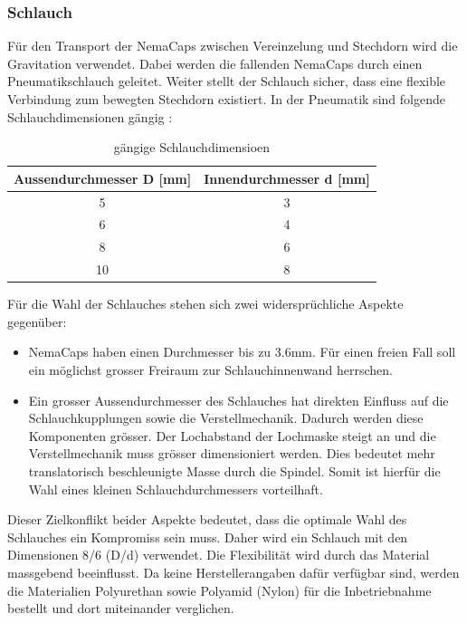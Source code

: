 \subsubsection{Schlauch}
Für den Transport der NemaCaps zwischen Vereinzelung und Stechdorn wird die Gravitation verwendet. Dabei werden die fallenden NemaCaps durch einen Pneumatikschlauch geleitet. Weiter stellt der Schlauch sicher, dass eine flexible Verbindung zum bewegten Stechdorn existiert. In der Pneumatik sind folgende Schlauchdimensionen gängig \cite{camozzi}:
\newline
\begin{table}[H]
\begin{tabular}{|c|c|}
	\hline 
	Aussendurchmesser D [mm] & Innendurchmesser d [mm] \\ 
	\hline 
	5 & 3 \\ 
	\hline 
	6 & 4  \\ 
	\hline 
	8 & 6 \\ 
	\hline 
	10 & 8  \\ 
	\hline 
\end{tabular}
	\caption{gängige Schlauchdimensioen}
	\label{tab:Schlauchdimensioen}
\end{table}

Für die Wahl der Schlauches stehen sich zwei widersprüchliche Aspekte gegenüber:
\begin{itemize}
	\item NemaCaps haben einen Durchmesser bis zu 3.6mm. Für einen freien Fall soll ein möglichst grosser Freiraum zur Schlauchinnenwand herrschen.
	
	\item Ein grosser Aussendurchmesser des Schlauches hat direkten Einfluss auf die Schlauchkupplungen sowie die Verstellmechanik. Dadurch werden diese Komponenten grösser. Der Lochabstand der Lochmaske steigt an und die Verstellmechanik muss grösser dimensioniert werden. Dies bedeutet mehr translatorisch beschleunigte Masse durch die Spindel. Somit ist hierfür die Wahl eines kleinen Schlauchdurchmessers vorteilhaft.
\end{itemize}
Dieser Zielkonflikt beider Aspekte bedeutet, dass die optimale Wahl des Schlauches ein Kompromiss sein muss. Daher wird ein Schlauch mit den Dimensionen 8/6 (D/d) verwendet.
\newline
Die Flexibilität wird durch das Material massgebend beeinflusst. Da keine Herstellerangaben dafür verfügbar sind, werden die Materialien Polyurethan sowie Polyamid (Nylon) für die Inbetriebnahme bestellt und dort miteinander verglichen.
\newpage
